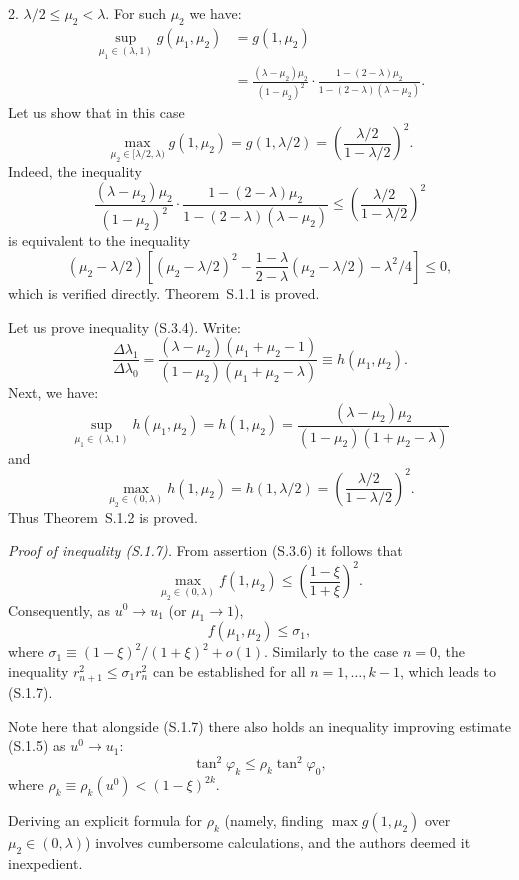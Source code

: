 \documentclass[11pt,oneside]{book}
\begin{document}
2. $\lambda/2 \leqslant \mu_2 < \lambda$. For such $\mu_2$ we have:
\[
\begin{aligned}
\sup_{\mu_1 \in (\lambda, 1)} g(\mu_1, \mu_2) &= g(1, \mu_2) \\
&= \frac{(\lambda - \mu_2)\mu_2}{(1 - \mu_2)^2} \cdot \frac{1 - (2 - \lambda)\mu_2}{1 - (2 - \lambda)(\lambda - \mu_2)}.
\end{aligned}
\]
Let us show that in this case
\[
\max_{\mu_2 \in [\lambda/2, \lambda)} g(1, \mu_2) = g(1, \lambda/2) = \left( \frac{\lambda/2}{1 - \lambda/2} \right)^2.
\]
Indeed, the inequality
\[
\frac{(\lambda - \mu_2)\mu_2}{(1 - \mu_2)^2} \cdot \frac{1 - (2 - \lambda)\mu_2}{1 - (2 - \lambda)(\lambda - \mu_2)} \leqslant \left( \frac{\lambda/2}{1 - \lambda/2} \right)^2
\]
is equivalent to the inequality
\[
(\mu_2 - \lambda/2) \left[ (\mu_2 - \lambda/2)^2 - \frac{1 - \lambda}{2 - \lambda} (\mu_2 - \lambda/2) - \lambda^2 / 4 \right] \leqslant 0,
\]
which is verified directly. Theorem~S.1.1 is proved.

Let us prove inequality (S.3.4). Write:
\[
\frac{\Delta\lambda_1}{\Delta\lambda_0} = \frac{(\lambda - \mu_2)(\mu_1 + \mu_2 - 1)}{(1 - \mu_2)(\mu_1 + \mu_2 - \lambda)} \equiv h(\mu_1, \mu_2).
\]
Next, we have:
\[
\sup_{\mu_1 \in (\lambda, 1)} h(\mu_1, \mu_2) = h(1, \mu_2) = \frac{(\lambda - \mu_2)\mu_2}{(1 - \mu_2)(1 + \mu_2 - \lambda)}
\]
and
\[
\max_{\mu_2 \in (0, \lambda)} h(1, \mu_2) = h(1, \lambda/2) = \left( \frac{\lambda/2}{1 - \lambda/2} \right)^2. \tag{S.3.8}
\]
Thus Theorem~S.1.2 is proved.

\textit{Proof of inequality (S.1.7).} From assertion (S.3.6) it follows that
\[
\max_{\mu_2 \in (0, \lambda)} f(1, \mu_2) \leqslant \left( \frac{1 - \xi}{1 + \xi} \right)^2.
\]
Consequently, as $u^0 \to u_1$ (or $\mu_1 \to 1$),
\[
f(\mu_1, \mu_2) \leqslant \sigma_1,
\]
where $\sigma_1 \equiv (1 - \xi)^2 / (1 + \xi)^2 + o(1)$. Similarly to the case $n = 0$, the inequality $r_{n+1}^2 \leqslant \sigma_1 r_n^2$ can be established for all $n = 1, \dots, k - 1$, which leads to (S.1.7).

Note here that alongside (S.1.7) there also holds an inequality improving estimate (S.1.5) as $u^0 \to u_1$:
\[
\tan^2 \varphi_k \leqslant \rho_k \tan^2 \varphi_0,
\]
where $\rho_k \equiv \rho_k(u^0) < (1 - \xi)^{2k}$.

Deriving an explicit formula for $\rho_k$ (namely, finding $\max g(1, \mu_2)$ over $\mu_2 \in (0, \lambda)$) involves cumbersome calculations, and the authors deemed it inexpedient.
\end{document}

